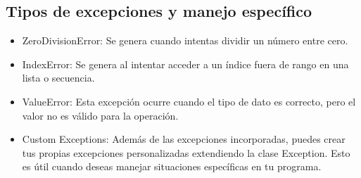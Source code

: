 \subsection{Tipos de excepciones y manejo específico}
\begin{itemize}
    \item ZeroDivisionError: Se genera cuando intentas dividir un número entre cero.
    \item IndexError: Se genera al intentar acceder a un índice fuera de rango en una lista o secuencia.
    \item ValueError: Esta excepción ocurre cuando el tipo de dato es correcto, pero el valor no es válido para la operación.
    \item Custom Exceptions: Además de las excepciones incorporadas, puedes crear tus propias excepciones personalizadas extendiendo la clase Exception. Esto es útil cuando deseas manejar situaciones específicas en tu programa.
\end{itemize}
